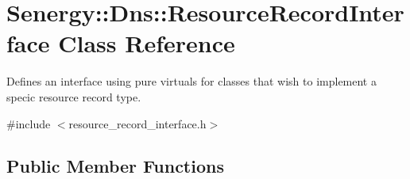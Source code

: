 \hypertarget{class_senergy_1_1_dns_1_1_resource_record_interface}{\section{Senergy\-:\-:Dns\-:\-:Resource\-Record\-Interface Class Reference}
\label{class_senergy_1_1_dns_1_1_resource_record_interface}
}


Defines an interface using pure virtuals for classes that wish to implement a specic resource record type.  




{\ttfamily \#include $<$resource\-\_\-record\-\_\-interface.\-h$>$}

\subsection*{Public Member Functions}
